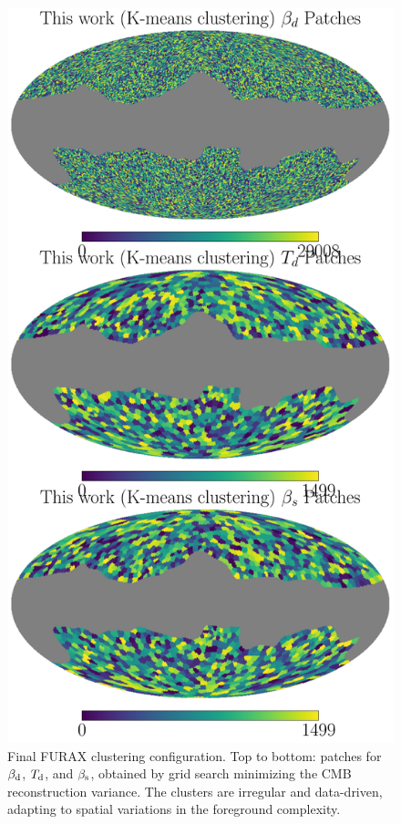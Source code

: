 \documentclass[fleqn,usenatbib]{mnras}
\begin{document}
\begin{figure}
    \centering
    \includegraphics[width=\linewidth]{figures/kmeans_patch_layout.pdf}
    \caption{
    Final FURAX clustering configuration. 
    Top to bottom: patches for \( \beta_{\rm d} \), \( T_{\rm d} \), and \( \beta_{\rm s} \), obtained by grid search minimizing the CMB reconstruction variance.
    The clusters are irregular and data-driven, adapting to spatial variations in the foreground complexity.
    }
    \label{fig:furax_patches}
\end{figure}
\end{document}
